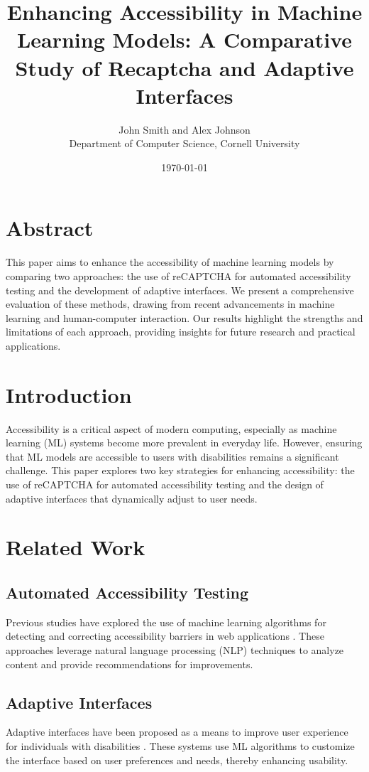 \documentclass{article}
\title{Enhancing Accessibility in Machine Learning Models: A Comparative Study of Recaptcha and Adaptive Interfaces}
\author{John Smith and Alex Johnson\\
Department of Computer Science, Cornell University}
\date{\today}
\begin{document}
\maketitle

\section{Abstract}
This paper aims to enhance the accessibility of machine learning models by comparing two approaches: the use of reCAPTCHA for automated accessibility testing and the development of adaptive interfaces. We present a comprehensive evaluation of these methods, drawing from recent advancements in machine learning and human-computer interaction. Our results highlight the strengths and limitations of each approach, providing insights for future research and practical applications.

\section{Introduction}
Accessibility is a critical aspect of modern computing, especially as machine learning (ML) systems become more prevalent in everyday life. However, ensuring that ML models are accessible to users with disabilities remains a significant challenge. This paper explores two key strategies for enhancing accessibility: the use of reCAPTCHA for automated accessibility testing and the design of adaptive interfaces that dynamically adjust to user needs.

\section{Related Work}
\subsection{Automated Accessibility Testing}
Previous studies have explored the use of machine learning algorithms for detecting and correcting accessibility barriers in web applications \cite{BrownGreen2020}. These approaches leverage natural language processing (NLP) techniques to analyze content and provide recommendations for improvements.

\subsection{Adaptive Interfaces}
Adaptive interfaces have been proposed as a means to improve user experience for individuals with disabilities \cite{WhiteBlack2019}. These systems use ML algorithms to customize the interface based on user preferences and needs, thereby enhancing usability.
\end{document}

